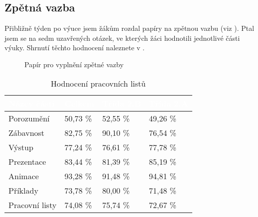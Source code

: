 \subsection{Zpětná vazba}
{Přibližně týden po výuce jsem žákům rozdal papíry na zpětnou vazbu (viz ). Ptal jsem se na sedm uzavřených otázek, ve kterých žáci hodnotili jednotlivé části výuky. Shrnutí těchto hodnocení naleznete v .}\\
\begin{minipage}{0.35\textwidth}
    \begin{figure}[H]
        \centering
        \setlength{\fboxsep}{0pt}
        \caption{Papír pro vyplnění zpětné vazby \jaObr}
        \label{obr:papirZpetnaVazba}
    \end{figure}
\end{minipage}\hfill
\begin{minipage}{0.6\textwidth}
    \renewcommand{\arraystretch}{1.25}
    \begin{table}[H]
        \begin{tabular}{|p{2.5cm}|p{1.7cm}|p{1.7cm}|p{1.7cm}|}
            \hline
            \rowcolor{black!60}
            \textcolor{white}{Název části} & \textcolor{white}{Celkem} & \textcolor{white}{Třída 2.B} & \textcolor{white}{Třída 2.A}\\
            \hline
            Porozumění & \hfill 50,73 \% & \hfill 52,55 \% & \hfill 49,26 \% \\
            \hline
            Zábavnost & \hfill 82,75 \% & \hfill 90,10 \% & \hfill 76,54 \% \\
            \hline
            Výstup & \hfill 77,24 \% & \hfill 76,61 \% & \hfill 77,78 \% \\
            \hline
            Prezentace & \hfill 83,44 \% & \hfill 81,39 \% & \hfill 85,19 \% \\
            \hline
            Animace & \hfill 93,28 \% & \hfill 91,48 \% & \hfill 94,81 \% \\
            \hline
            Příklady & \hfill 73,78 \% & \hfill 80,00 \% & \hfill 71,48 \% \\
            \hline
            Pracovní listy & \hfill 74,08 \% & \hfill 75,74 \% & \hfill 72,67 \% \\
            \hline
        \end{tabular}
        \caption{Hodnocení pracovních listů \jaTab}
        \label{tab:zpetnaVazba}
    \end{table}
\end{minipage}\odst
